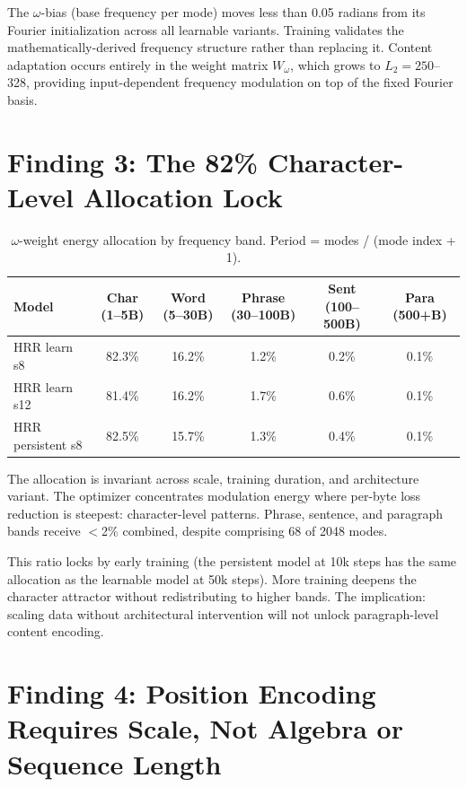 \documentclass[11pt,a4paper]{article}
\begin{document}
The $\omega$-bias (base frequency per mode) moves less than 0.05 radians from its Fourier initialization across all learnable variants. Training validates the mathematically-derived frequency structure rather than replacing it. Content adaptation occurs entirely in the weight matrix $W_\omega$, which grows to $L_2 = 250$--328, providing input-dependent frequency modulation on top of the fixed Fourier basis.

\section{Finding 3: The 82\% Character-Level Allocation Lock}

\begin{table}[h]
\centering
\caption{$\omega$-weight energy allocation by frequency band. Period = modes / (mode index + 1).}
\begin{tabular}{lccccc}
\toprule
Model & Char (1--5B) & Word (5--30B) & Phrase (30--100B) & Sent (100--500B) & Para (500+B) \\
\midrule
HRR learn s8 & 82.3\% & 16.2\% & 1.2\% & 0.2\% & 0.1\% \\
HRR learn s12 & 81.4\% & 16.2\% & 1.7\% & 0.6\% & 0.1\% \\
HRR persistent s8 & 82.5\% & 15.7\% & 1.3\% & 0.4\% & 0.1\% \\
\bottomrule
\end{tabular}
\end{table}

The allocation is invariant across scale, training duration, and architecture variant. The optimizer concentrates modulation energy where per-byte loss reduction is steepest: character-level patterns. Phrase, sentence, and paragraph bands receive $<$2\% combined, despite comprising 68 of 2048 modes.

This ratio locks by early training (the persistent model at 10k steps has the same allocation as the learnable model at 50k steps). More training deepens the character attractor without redistributing to higher bands. The implication: scaling data without architectural intervention will not unlock paragraph-level content encoding.

\section{Finding 4: Position Encoding Requires Scale, Not Algebra or Sequence Length}
\end{document}
